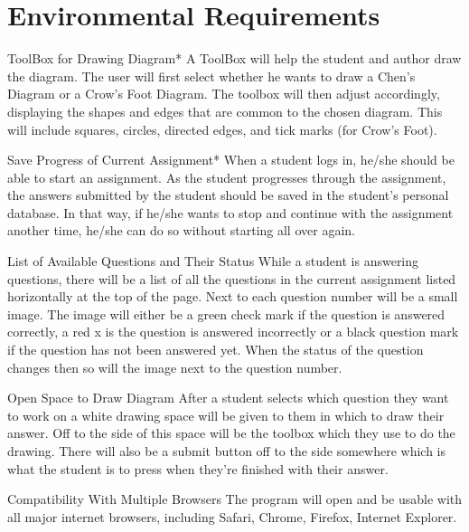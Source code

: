 \chapter{Environmental Requirements}


    \begin{section}{ToolBox for Drawing Diagram*}
    A ToolBox will help the student and author draw the diagram. The user will first select whether he wants to draw a Chen's Diagram or a Crow's Foot Diagram. The toolbox will then adjust accordingly, displaying the shapes and edges that are common to the chosen diagram. This will include squares, circles, directed edges, and tick marks (for Crow's Foot).
    \end{section}
    
    \begin{section}{Save Progress of Current Assignment*}
    When a student logs in, he/she should be able to start an assignment. As the student progresses through the assignment, the answers submitted by the student should be saved in the student's personal database. In that way, if he/she wants to stop and continue with the assignment another time, he/she can do so without starting all over again.
    \end{section}
    
    \begin{section}{List of Available Questions and Their Status}
    While a student is answering questions, there will be a list of all the questions in the current assignment listed horizontally at the top of the page.  Next to each question number will be a small image.  The image will either be a green check mark if the question is answered correctly, a red x is the question is answered incorrectly or a black question mark if the question has not been answered yet.  When the status of the question changes then so will the image next to the question number.
    \end{section}
    
    \begin{section}{Open Space to Draw Diagram}
    After a student selects which question they want to work on a white drawing space will be given to them in which to draw their answer. Off to the side of this space will be the toolbox which they use to do the drawing. There will also be a submit button off to the side somewhere which is what the student is to press when they're finished with their answer.
    \end{section}
    
    \begin{section}{Compatibility With Multiple Browsers}
    The program will open and be usable with all major internet browsers, including Safari, Chrome, Firefox, Internet Explorer.
    \end{section}






